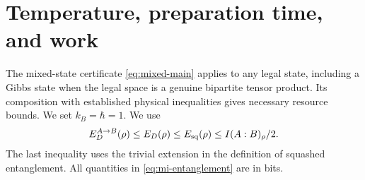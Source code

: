 \section{Temperature, preparation time, and work}\label{sec:thermal}
The mixed-state certificate \eqref{eq:mixed-main} applies to any legal
state, including a Gibbs state when the legal space is a genuine
bipartite tensor product. Its composition with established physical
inequalities gives necessary resource bounds. We set $k_B=\hbar=1$.
We use \cite{cw}
\begin{equation}\label{eq:mi-entanglement}
 E_D^{A\to B}(\rho)\leq E_D(\rho)\leq E_{\rm sq}(\rho)\leq I(A:B)_\rho/2.
\end{equation}
The last inequality uses the trivial extension in the definition of
squashed entanglement. All quantities in \eqref{eq:mi-entanglement}
are in bits.

